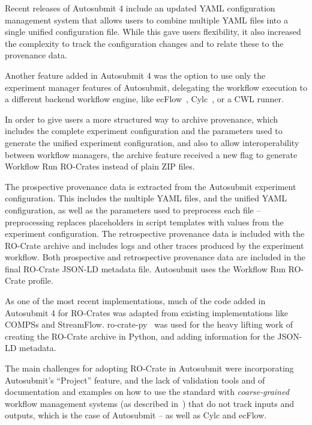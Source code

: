 \documentclass[10pt,letterpaper]{article}
\begin{document}
Recent releases of Autosubmit 4 include an updated YAML configuration management system that allows users to combine multiple YAML files into a single unified configuration file.
While this gave users flexibility, it also increased the complexity to track the configuration changes and to relate these to the provenance data.

Another feature added in Autosubmit 4 was the option to use only the experiment manager features of Autosubmit, delegating the workflow execution to a different backend workflow engine, like ecFlow~\cite{Bahra 2011}, Cylc~\cite{Oliver 2023}, or a CWL runner.

In order to give users a more structured way to archive provenance, which includes the complete experiment configuration and the parameters used to generate the unified experiment configuration, and also to allow interoperability between workflow managers, the archive feature received a new flag to generate Workflow Run RO-Crates instead of plain ZIP files.

The prospective provenance data is extracted from the Autosubmit experiment configuration.
This includes the multiple YAML files, and the unified YAML configuration, as well as the parameters used to preprocess each file -- preprocessing replaces placeholders in script templates with values from the experiment configuration.
The retrospective provenance data is included with the RO-Crate archive and includes logs and other traces produced by the experiment workflow.
Both prospective and retrospective provenance data are included in the final RO-Crate JSON-LD metadata file. Autosubmit uses the Workflow Run RO-Crate profile.

As one of the most recent implementations, much of the code added in Autosubmit 4 for RO-Crates was adapted from existing implementations like COMPSs and StreamFlow.
ro-crate-py~\cite{De Geest 2022a} was used for the heavy lifting work of creating the RO-Crate archive in Python, and adding information for the JSON-LD metadata.

The main challenges for adopting RO-Crate in Autosubmit were incorporating Autosubmit's ``Project'' feature, and the lack of validation tools and of documentation and examples on how to use the standard with \emph{coarse-grained} workflow management systems (as described in~\cite{Goble 2020}) that do not track inputs and outputs, which is the case of Autosubmit -- as well as Cylc and ecFlow.
\end{document}
